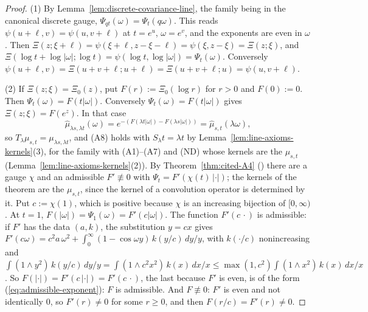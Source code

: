 \begin{proof}
(1) By Lemma~\ref{lem:discrete-covariance-line}, the family being in the canonical discrete gauge,
$\Psi_{qt}(\omega) = \Psi_t(q\omega)$. This reads $\psi(u + \ell, v) = \psi(u, v + \ell)$ at
$t = e^u$, $\omega = e^v$, and the exponents are even in $\omega$. Then
$\Xi(z;\xi + \ell) = \psi(\xi + \ell, z - \xi - \ell) = \psi(\xi, z - \xi) = \Xi(z;\xi)$, and
$\Xi(\log t + \log|\omega|;\log t) = \psi(\log t, \log|\omega|) = \Psi_t(\omega)$. Conversely
$\psi(u + \ell, v) = \Xi(u + v + \ell; u + \ell) = \Xi(u + v + \ell; u) = \psi(u, v + \ell)$.

(2) If $\Xi(z;\xi) = \Xi_0(z)$, put $F(r) := \Xi_0(\log r)$ for $r > 0$ and $F(0) := 0$. Then
$\Psi_t(\omega) = F(t|\omega|)$. Conversely $\Psi_t(\omega) = F(t|\omega|)$ gives
$\Xi(z;\xi) = F(e^z)$. In that case
\[
  \widehat\mu_{\lambda s,\lambda t}(\omega) = e^{-(F(\lambda t|\omega|) - F(\lambda s|\omega|))}
  = \widehat\mu_{s,t}(\lambda\omega),
\]
so $T_\lambda\mu_{s,t} = \mu_{\lambda s,\lambda t}$, and (A8) holds with $S_\lambda t = \lambda t$
by Lemma~\ref{lem:line-axioms-kernels}(3), for the family with (A1)--(A7) and (ND) whose kernels
are the $\mu_{s,t}$ (Lemma~\ref{lem:line-axioms-kernels}(2)). By Theorem~\ref{thm:cited-A4}
() there are a gauge $\chi$ and an admissible $F' \not\equiv 0$
with $\Psi_t = F'(\chi(t)\,|\cdot|)$; the kernels of the theorem are the $\mu_{s,t}$, since the
kernel of a convolution operator is determined by it. Put $c := \chi(1)$, which is positive because $\chi$ is an
increasing bijection of $[0,\infty)$. At $t = 1$, $F(|\omega|) = \Psi_1(\omega) = F'(c|\omega|)$.
The function $F'(c\,\cdot)$ is admissible: if $F'$ has the data $(a, k)$, the substitution
$y = cx$ gives $F'(c\omega) = c^2a\,\omega^2 + \int_0^\infty(1 - \cos\omega y)\,k(y/c)\,dy/y$, with
$k(\cdot/c)$ nonincreasing and
$\int(1 \wedge y^2)\,k(y/c)\,dy/y = \int(1 \wedge c^2x^2)\,k(x)\,dx/x \le
\max(1, c^2)\int(1 \wedge x^2)\,k(x)\,dx/x$. So $F(|\cdot|) = F'(c\,|\cdot|) = F'(c\,\cdot)$, the
last because $F'$ is even, is of the form (\ref{eq:admissible-exponent}): $F$ is admissible. And $F \not\equiv 0$:
$F'$ is even and not identically $0$, so $F'(r) \ne 0$ for some $r \ge 0$, and then
$F(r/c) = F'(r) \ne 0$.


\end{proof}
